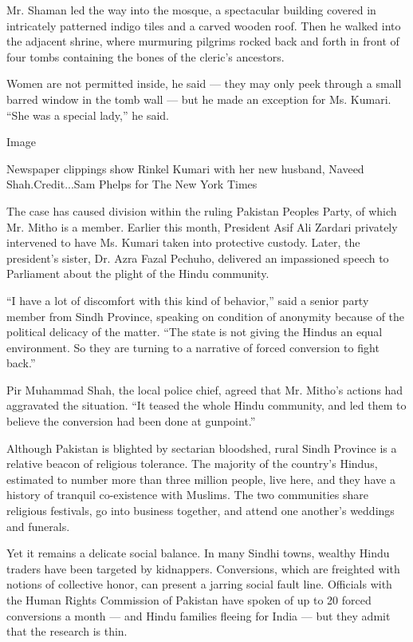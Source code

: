 Mr. Shaman led the way into the mosque, a spectacular building covered
in intricately patterned indigo tiles and a carved wooden roof. Then he
walked into the adjacent shrine, where murmuring pilgrims rocked back
and forth in front of four tombs containing the bones of the cleric's
ancestors.

Women are not permitted inside, he said --- they may only peek through a
small barred window in the tomb wall --- but he made an exception for
Ms. Kumari. ``She was a special lady,'' he said.

Image

Newspaper clippings show Rinkel Kumari with her new husband, Naveed
Shah.Credit...Sam Phelps for The New York Times

The case has caused division within the ruling Pakistan Peoples Party,
of which Mr. Mitho is a member. Earlier this month, President Asif Ali
Zardari privately intervened to have Ms. Kumari taken into protective
custody. Later, the president's sister, Dr. Azra Fazal Pechuho,
delivered an impassioned speech to Parliament about the plight of the
Hindu community.

``I have a lot of discomfort with this kind of behavior,'' said a senior
party member from Sindh Province, speaking on condition of anonymity
because of the political delicacy of the matter. ``The state is not
giving the Hindus an equal environment. So they are turning to a
narrative of forced conversion to fight back.''

Pir Muhammad Shah, the local police chief, agreed that Mr. Mitho's
actions had aggravated the situation. ``It teased the whole Hindu
community, and led them to believe the conversion had been done at
gunpoint.''

Although Pakistan is blighted by sectarian bloodshed, rural Sindh
Province is a relative beacon of religious tolerance. The majority of
the country's Hindus, estimated to number more than three million
people, live here, and they have a history of tranquil co-existence with
Muslims. The two communities share religious festivals, go into business
together, and attend one another's weddings and funerals.

Yet it remains a delicate social balance. In many Sindhi towns, wealthy
Hindu traders have been targeted by kidnappers. Conversions, which are
freighted with notions of collective honor, can present a jarring social
fault line. Officials with the Human Rights Commission of Pakistan have
spoken of up to 20 forced conversions a month --- and Hindu families
fleeing for India --- but they admit that the research is thin.

